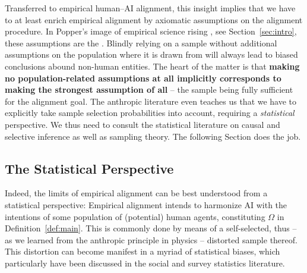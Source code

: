 \documentclass{article}
\theoremstyle{plain}
\theoremstyle{definition}
\theoremstyle{remark}
\begin{document}
Transferred to empirical human--AI alignment, this insight implies that we have to at least enrich empirical alignment by axiomatic assumptions on the alignment procedure. In Popper's image of empirical science rising , see Section~\ref{sec:intro}, these assumptions are the  %
\citep[page 93-94]{popper:logic}.  
Blindly relying on a sample without additional assumptions on the population where it is drawn from will always lead to biased conclusions abound non-human entities. The heart of the matter is that \textbf{making no population-related assumptions at all implicitly corresponds to making the strongest assumption of all} -- the sample being fully sufficient for the alignment goal. 
%
The anthropic literature even teaches us that we have to explicitly take sample selection probabilities into account, requiring a \textit{statistical} perspective. We thus need to consult the statistical literature on causal and selective inference as well as sampling theory. The following Section does the job. 


\subsection{The Statistical Perspective}\label{sec:stats-biases}

Indeed, the limits of empirical alignment can be best understood from a statistical perspective: Empirical alignment intends to harmonize AI with the intentions of some population of (potential) human agents, constituting $\Omega$ in Definition~\ref{def:main}. This is commonly done by means of a self-selected, thus -- as we learned from the anthropic principle in physics -- distorted sample thereof. This distortion can become manifest in a myriad of statistical biases, 
which particularly have been discussed in the social and survey statistics literature. 
\end{document}
